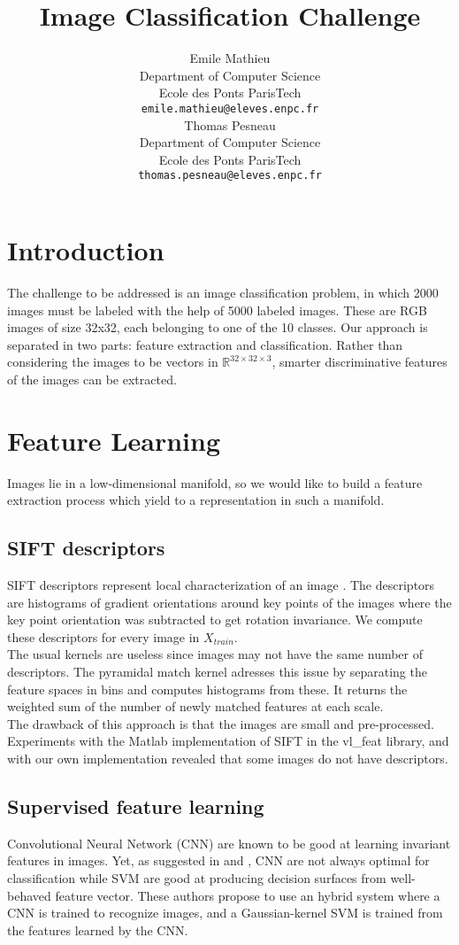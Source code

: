 \documentclass{article} %
\title{Image Classification Challenge}
\author{
Emile Mathieu \\ %
Department of Computer Science\\
Ecole des Ponts ParisTech\\
\texttt{emile.mathieu@eleves.enpc.fr} \\
\And
Thomas Pesneau \\
Department of Computer Science\\
Ecole des Ponts ParisTech \\
\texttt{thomas.pesneau@eleves.enpc.fr} \\
}
\begin{document}
\maketitle

\section{Introduction}
\quad The challenge to be addressed is an image classification problem, in which 2000 images must be labeled with the help of 5000 labeled images. These are RGB images of size 32x32, each belonging to one of the 10 classes.
Our approach is separated in two parts: feature extraction and classification. Rather than considering the images to be vectors in $\mathbb{R}^{32 \times 32 \times 3}$, smarter discriminative features of the images can be extracted.

\section{Feature Learning}
Images lie in a low-dimensional manifold, so we would like to build a feature extraction process which yield to a representation in such a manifold.

\subsection{SIFT descriptors}

\quad SIFT descriptors represent local characterization of an image \cite{Lowe2004}. The descriptors are histograms of gradient orientations around key points of the images where the key point orientation was subtracted to get rotation invariance. We compute these descriptors for every image in $X_{train}$.\\
The usual kernels are useless since images may not have the same number of descriptors. The pyramidal match kernel \cite{GraumanDarrell2005} adresses this issue by separating the feature spaces in bins and computes histograms from these. It returns the weighted sum of the number of newly matched features at each scale.\\
The drawback of this approach is that the images are small and pre-processed. Experiments with the Matlab implementation of SIFT in the vl\_feat library, and with our own implementation revealed that some images do not have descriptors.

\subsection{Supervised feature learning}
Convolutional Neural Network (CNN) \cite{Lecun98} are known to be good at learning invariant features in images. Yet, as suggested in \cite{Huang:2006} and \cite{Tang13}, CNN are not always optimal for classification while SVM are good at producing decision surfaces from well-behaved feature vector. These authors propose to use an hybrid system where a CNN is trained to recognize images, and a Gaussian-kernel SVM is trained from the features learned by the CNN.
\end{document}
